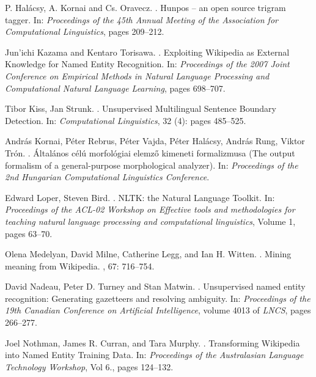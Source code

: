 \documentclass[11pt]{article}
\begin{document}
\begin{thebibliography}{}
P. Halácsy, A. Kornai and Cs. Oravecz.
.
\newblock Hunpos -- an open source trigram tagger. 
\newblock In: {\em Proceedings of the 45th Annual Meeting of the Association for Computational Linguistics}, pages 209--212.

Jun'ichi Kazama and Kentaro Torisawa.
.
\newblock Exploiting Wikipedia as External Knowledge for Named Entity Recognition.
\newblock In: {\em Proceedings of the 2007 Joint Conference on Empirical Methods in Natural Language Processing and Computational Natural Language Learning}, pages 698--707.

Tibor Kiss, Jan Strunk.
.
\newblock Unsupervised Multilingual Sentence Boundary Detection. 
\newblock In: {\em Computational Linguistics}, 32 (4): pages 485--525.

András Kornai, Péter Rebrus, Péter Vajda, Péter Halácsy, András Rung, Viktor Trón.
.
\newblock Általános célú morfológiai elemző kimeneti formalizmusa (The output formalism of a general-purpose morphological analyzer).
\newblock In: {\em Proceedings of the 2nd Hungarian Computational Linguistics Conference}.

Edward Loper, Steven Bird.
.
\newblock NLTK: the Natural Language Toolkit. 
\newblock In: {\em Proceedings of the ACL-02 Workshop on Effective tools and methodologies for teaching natural language processing and computational linguistics}, Volume 1, pages 63--70.

Olena Medelyan, David Milne, Catherine Legg, and Ian H. Witten.
.
\newblock Mining meaning from Wikipedia.
, 67: 716--754.

David Nadeau, Peter D. Turney and Stan Matwin.
.
\newblock Unsupervised named entity recognition: Generating gazetteers and resolving ambiguity. 
\newblock In: {\em Proceedings of the 19th Canadian Conference on Artificial Intelligence}, volume 4013 of {\em LNCS}, pages 266--277.

Joel Nothman, James R. Curran, and Tara Murphy.
.
\newblock Transforming Wikipedia into Named Entity Training Data.
\newblock In: {\em Proceedings of the Australasian Language Technology Workshop}, Vol 6., pages 124--132.


\end{thebibliography}
\end{document}
